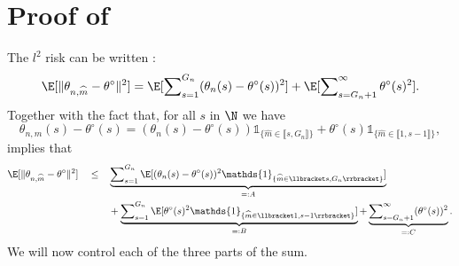 \section{Proof of }
The $l^{2}$ risk can be written :
\[\E[\Vert \theta_{n, \widehat{m}} - \theta^{\circ} \Vert^{2}] = \E[\sum\nolimits_{s = 1}^{G_{n}} ( \theta_{n}(s) - \theta^{\circ}(s) )^{2}] + \E[\sum\nolimits_{s = G_{n} + 1}^{\infty} \theta^{\circ}(s)^{2}].\]
Together with the fact that, for all $s$ in $\N$ we have
\[\theta_{n, \widehat{m}}(s) - \theta^{\circ}(s) = (\theta_{n}(s) - \theta^{\circ}(s)) \mathds{1}_{\{\widehat{m} \in \llbracket s, G_{n} \rrbracket\}} + \theta^{\circ}(s) \mathds{1}_{\{\widehat{m} \in \llbracket 1, s-1 \rrbracket\}},\]
implies that
\begin{alignat*}{3}
& \E[\Vert \theta_{n, \widehat{m}} - \theta^{\circ} \Vert^{2}] && \leq && \underbrace{\sum\nolimits_{s = 1}^{G_{n}}\E[(\theta_{n}(s) - \theta^{\circ}(s))^{2} \mathds{1}_{\{\widehat{m} \in \llbracket s, G_{n} \rrbracket\}}]}_{=: A}\\
& && && + \underbrace{\sum\nolimits_{s = 1}^{G_{n}}\E[\theta^{\circ}(s)^{2} \mathds{1}_{\{\widehat{m} \in \llbracket 1, s-1 \rrbracket\}}]}_{=: B}+ \underbrace{\sum\nolimits_{s = G_{n} + 1}^{\infty}( \theta^{\circ}(s))^{2}}_{=: C}.
\end{alignat*}
We will now control each of the three parts of the sum.

